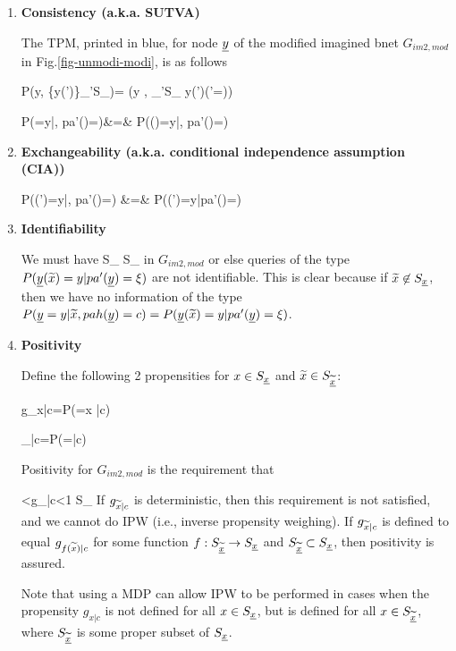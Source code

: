 \begin{enumerate}


\item {\bf Consistency (a.k.a. SUTVA)}

The TPM, printed in  blue, for node ${\underline{y}}$
of the modified imagined bnet $G_{im2,mod}$ in Fig.\ref{fig-unmodi-modi},
 is as follows

\beq \color{blue}
P(y\cond \tilx, \{y(\tilx')\}_{\tilx'\in S_{\ul{\tilx}}})=
\delta(y , \sum_{\tilx'\in S_{\ul{\tilx}}}
 y(\tilx')\indi(\tilx'=\tilx))
\eeq

\beqa
P(\rvy=y|\tilx, pa'(\rvy)=\xi)&=&
P(\rvy(\tilx)=y|\tilx, pa'(\rvy)=\xi)
\eeqa


\item {\bf Exchangeability (a.k.a.
conditional independence assumption (CIA))}

\beqa
P(\rvy(\tilx')=y|\tilx, pa'(\rvy)=\xi)
&=&
P(\rvy(\tilx')=y|pa'(\rvy)=\xi)
\eeqa

\item {\bf Identifiability}

We must have
\beq
S_{\ul{\tilx}} \subset S_\rvx
\eeq
in $G_{im2, mod}$
or else queries of the type
 $P({\underline{y}}({\widetilde{x}})=y|pa'({\underline{y}})=\xi)$ are not identifiable.
This is clear because if ${\widetilde{x}}\not\in S_{\underline{x}}$,
then we have no information of the type
$P({\underline{y}}=y|{\widetilde{x}}, pah({\underline{y}})=c)=P({\underline{y}}({\widetilde{x}})=y|pa'({\underline{y}})=\xi)$.

\item{\bf Positivity}

Define the following 2 propensities
for $x\in S_{\underline{x}}$ and ${\widetilde{x}} \in S_{\underline{{\widetilde{x}}}}$:

\beq
g_{x|c}=P(\rvx=x |c)
\eeq

\beq
\tilg_{\tilx|c}=P(\ul{\tilx}=\tilx |c)
\eeq

Positivity for  $G_{im2,mod}$
is the requirement that

<g_{\tilx|c}<1  \tilx \in S_{\ul{\tilx}}
\eeq
If $g_{{\widetilde{x}}|c}$
is deterministic, then this requirement
is not satisfied, and we cannot do IPW (i.e.,
inverse propensity weighing).
If $g_{{\widetilde{x}}|c}$
is defined to equal $g_{f({\widetilde{x}})|c}$ for some
function $f:S_{\underline{{\widetilde{x}}}}\rightarrow S_{\underline{x}}$
and $S_{\underline{{\widetilde{x}}}}\subset S_{\underline{x}}$, then
positivity is assured.

Note that using a MDP can allow IPW to
be performed  in cases
when the propensity $g_{x|c}$
is not defined for all $x\in S_{\underline{x}}$, but is defined
for all $x\in S_{\underline{{\widetilde{x}}}}$, where
$S_{\underline{{\widetilde{x}}}}$
is some proper subset of $S_{\underline{x}}$.

\end{enumerate}

